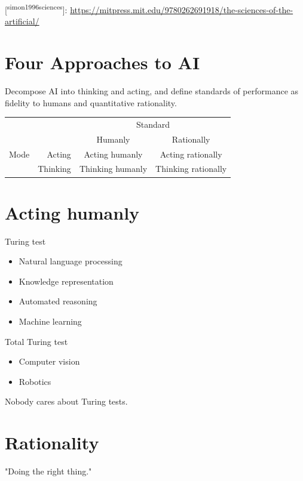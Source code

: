 \documentclass[11pt]{article}
\begin{document}
{[}\textsuperscript{simon1996sciences}]: \url{https://mitpress.mit.edu/9780262691918/the-sciences-of-the-artificial/}
\section{Four Approaches to AI}
\label{sec:org8cd81d0}

Decompose AI into thinking and acting, and define standards of performance as fidelity to humans and quantitative rationality.


\begin{tabular}{lr|cc}\\
     &          & \multicolumn{2}{c}{Standard} \\
     &          & Humanly  & Rationally \\\hline
Mode & Acting   & Acting humanly & Acting rationally \\
     & Thinking & Thinking humanly & Thinking rationally \\
\end{tabular}
\section{Acting humanly}
\label{sec:org7a71ecd}

Turing test

\begin{itemize}
\item Natural language processing
\item Knowledge representation
\item Automated reasoning
\item Machine learning
\end{itemize}

Total Turing test

\begin{itemize}
\item Computer vision
\item Robotics
\end{itemize}

Nobody cares about Turing tests.
\section{Rationality}
\label{sec:orgc1d8f1d}

"Doing the right thing."
\end{document}
